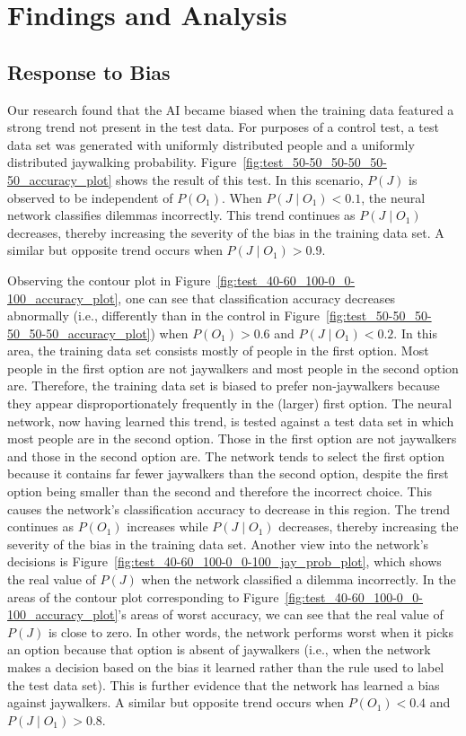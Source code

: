 \documentclass[]{report}
\begin{document}
\FloatBarrier
\chapter{Findings and Analysis}

\section{Response to Bias}

Our research found that the AI became biased when the training data featured a strong trend not
present in the test data. For purposes of a control test, a test data set was generated with
uniformly distributed people and a uniformly distributed jaywalking probability.
Figure~\ref{fig:test_50-50_50-50_50-50_accuracy_plot} shows the result of this test. In this
scenario, $P(J)$ is observed to be independent of $P(O_1)$. When $P(J \mid O_1) < 0.1$, the neural
network classifies dilemmas incorrectly. This trend continues as $P(J \mid O_1)$ decreases, thereby
increasing the severity of the bias in the training data set. A similar but opposite trend occurs
when $P(J \mid O_1) > 0.9$.

Observing the contour plot in Figure~\ref{fig:test_40-60_100-0_0-100_accuracy_plot}, one can see
that classification accuracy decreases abnormally (i.e., differently than in the control in
Figure~\ref{fig:test_50-50_50-50_50-50_accuracy_plot}) when $P(O_1) > 0.6$ and $P(J \mid O_1) <
0.2$. In this area, the training data set consists mostly of people in the first option. Most people
in the first option are not jaywalkers and most people in the second option are. Therefore, the
training data set is biased to prefer non-jaywalkers because they appear disproportionately
frequently in the (larger) first option. The neural network, now having learned this trend, is
tested against a test data set in which most people are in the second option. Those in the first
option are not jaywalkers and those in the second option are. The network tends to select the first
option because it contains far fewer jaywalkers than the second option, despite the first option
being smaller than the second and therefore the incorrect choice. This causes the network's
classification accuracy to decrease in this region. The trend continues as $P(O_1)$ increases while
$P(J \mid O_1)$ decreases, thereby increasing the severity of the bias in the training data set.
Another view into the network's decisions is Figure~\ref{fig:test_40-60_100-0_0-100_jay_prob_plot},
which shows the real value of $P(J)$ when the network classified a dilemma incorrectly. In the areas
of the contour plot corresponding to Figure~\ref{fig:test_40-60_100-0_0-100_accuracy_plot}'s areas
of worst accuracy, we can see that the real value of $P(J)$ is close to zero. In other words, the
network performs worst when it picks an option because that option is absent of jaywalkers (i.e.,
when the network makes a decision based on the bias it learned rather than the rule used to label
the test data set). This is further evidence that the network has learned a bias against jaywalkers.
A similar but opposite trend occurs when $P(O_1) < 0.4$ and $P(J \mid O_1) > 0.8$.
\end{document}
